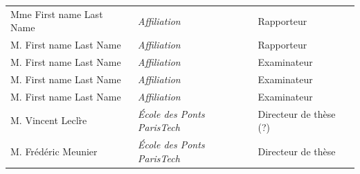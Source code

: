 \begin{tabular}{lll}
{\Large Mme First name {\sc Last Name}} & {\large{\it Affiliation}} & {\large Rapporteur}\\[0.5ex]
{\Large M. First name {\sc Last Name}} & {\large{\it Affiliation}} & {\large Rapporteur}\\[0.5ex]
{\Large M. First name {\sc Last Name}} & {\large{\it Affiliation}} & {\large Examinateur}\\[0.5ex]
{\Large M. First name {\sc Last Name}} & {\large{\it Affiliation}} & {\large Examinateur}\\[0.5ex]
{\Large M. First name {\sc Last Name}} & {\large{\it Affiliation}} & {\large Examinateur}\\[0.5ex]
{\Large M. Vincent {\sc Lecl\`re}} & {\large{\it \'Ecole des Ponts ParisTech}} & {\large Directeur de th\`ese (?)}\\[0.5ex]
{\Large M. Fr\'ed\'eric {\sc Meunier}} & {\large{\it \'Ecole des Ponts ParisTech}} & {\large Directeur de th\`ese}

\end{tabular}
